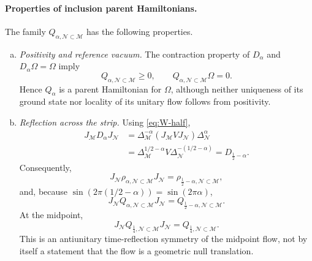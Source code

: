 \documentclass[a4paper,11pt]{article}
\theoremstyle{definition}
\newcommand{\mN}{\mathcal{N}}
\newcommand{\mM}{\mathcal{M}}
\begin{document}
\paragraph{Properties of inclusion parent Hamiltonians.}
The family $Q_{\alpha,\mN\subset\mM}$ has the following properties.
\begin{enumerate}[(a)]
\item \emph{Positivity and reference vacuum.}
The contraction property of $D_\alpha$ and
$D_\alpha\Omega=\Omega$ imply
\begin{equation}
    Q_{\alpha,\mN\subset\mM}\geq0,
    \qquad
    Q_{\alpha,\mN\subset\mM}\Omega=0.
    \label{eq:Q-parent-positive-property}
\end{equation}
Hence $Q_\alpha$ is a parent Hamiltonian for $\Omega$, although
neither uniqueness of its ground state nor locality of its unitary
flow follows from positivity.

\item \emph{Reflection across the strip.}
Using \eqref{eq:W-half},
\begin{align}
    J_{\mM}D_\alpha J_{\mN}
    &=
    \Delta_{\mM}^{-\alpha}
    (J_{\mM}VJ_{\mN})
    \Delta_{\mN}^\alpha
    \nonumber\\
    &=
    \Delta_{\mM}^{1/2-\alpha}
    V\Delta_{\mN}^{-(1/2-\alpha)}
    =D_{\frac12-\alpha}.
    \label{eq:W-reflection}
\end{align}
Consequently,
\begin{equation}
    \boxed{
    J_{\mN}\rho_{\alpha,\mN\subset\mM}J_{\mN}
    =\rho_{\frac12-\alpha,\mN\subset\mM},
    }
    \label{eq:rho-reflection}
\end{equation}
and, because $\sin(2\pi(1/2-\alpha))=\sin(2\pi\alpha)$,
\begin{equation}
    \boxed{
    J_{\mN}Q_{\alpha,\mN\subset\mM}J_{\mN}
    =Q_{\frac12-\alpha,\mN\subset\mM}.
    }
    \label{eq:H-reflection}
\end{equation}
At the midpoint,
\begin{equation}
    J_{\mN}Q_{\frac14,\mN\subset\mM}J_{\mN}
    =Q_{\frac14,\mN\subset\mM}.
    \label{eq:H-quarter-real}
\end{equation}
This is an antiunitary time-reflection symmetry of the midpoint flow,
not by itself a statement that the flow is a geometric null translation.


\end{enumerate}
\end{document}
